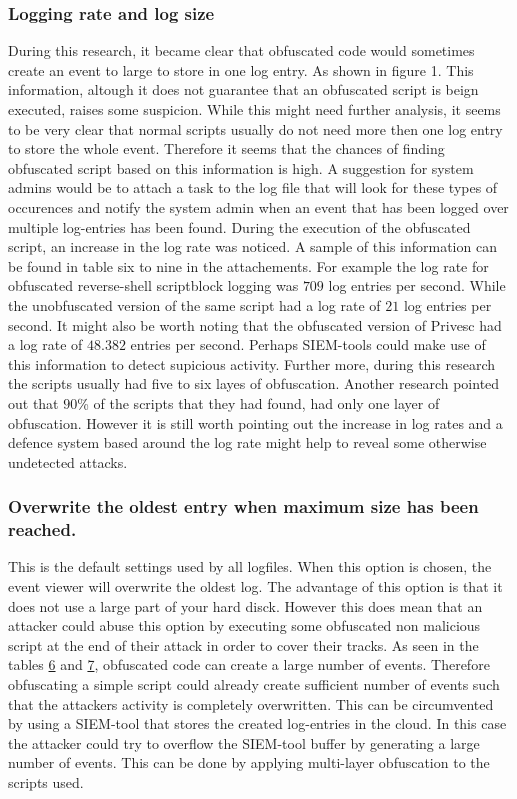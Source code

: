 \documentclass{article}%
\begin{document}
\subsubsection{Logging rate and log size}
During this research, it became clear that obfuscated code would sometimes create an event to large to store in one log entry. As shown in figure 1. This information, altough it does not guarantee that an obfuscated script is beign executed, raises some suspicion. While this might need further analysis, it seems to be very clear that normal scripts usually do not need more then one log entry to store the whole event. Therefore it seems that the chances of finding obfuscated script based on this information is high. A suggestion for system admins would be to attach a task to the log file that will look for these types of occurences and notify the system admin when an event that has been logged over multiple log-entries has been found.\newline
During the execution of the obfuscated script, an increase in the log rate was noticed. A sample of this information can be found in table six to nine in the attachements. For example the log rate for obfuscated reverse-shell scriptblock logging was $709$ log entries per second. While the unobfuscated version of the same script had a log rate of $21$ log entries per second. It might also be worth noting that the obfuscated version of Privesc had a log rate of $48.382$ entries per second.
Perhaps SIEM-tools could make use of this information to detect supicious activity.
Further more, during this research the scripts usually had five to six layes of obfuscation. Another research pointed out that $90$\% of the scripts that they had found, had only one layer of obfuscation. However it is still worth pointing out the increase in log rates and a defence system based around the log rate might help to reveal some otherwise undetected attacks.
\subsubsection{Overwrite the oldest entry when maximum size has been reached.}
This is the default settings used by all logfiles. When this option is chosen, the event viewer will overwrite the oldest log. The advantage of this option is that it does not use a large part of your hard disck. However this does mean that an attacker could abuse this option by executing some obfuscated non malicious script at the end of their attack in order to cover their tracks. As seen in the tables \hyperlink{table6}{6} and \hyperlink{table7}{7}, obfuscated code can create a large number of events. Therefore obfuscating a simple script could already create sufficient number of events such that the attackers activity is completely overwritten. This can be circumvented by using a SIEM-tool that stores the created log-entries in the cloud. In this case the attacker could try to overflow the SIEM-tool buffer by generating a large number of events. This can be done by applying multi-layer obfuscation to the scripts used.
\end{document}
